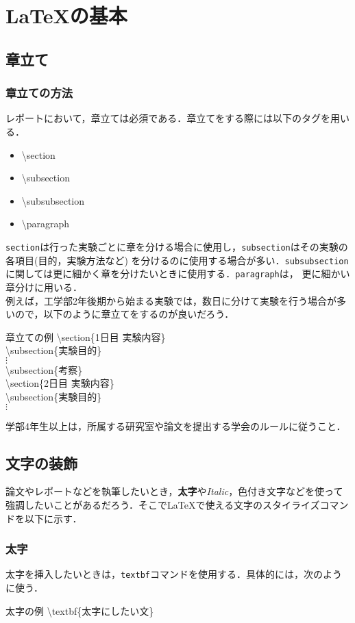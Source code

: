 \section{\LaTeX の基本}
\subsection{章立て}
\subsubsection{章立ての方法}
レポートにおいて，章立ては必須である．章立てをする際には以下のタグを用いる．
\begin{itemize}
  \item \ttfamily \textbackslash section
  \item \textbackslash subsection
  \item \textbackslash subsubsection
  \item \textbackslash paragraph
\end{itemize}
\texttt{section}は行った実験ごとに章を分ける場合に使用し，\texttt{subsection}はその実験の各項目(目的，実験方法など)
を分けるのに使用する場合が多い．\texttt{subsubsection}に関しては更に細かく章を分けたいときに使用する．\texttt{paragraph}は，
更に細かい章分けに用いる．\\
例えば，工学部2年後期から始まる実験では，数日に分けて実験を行う場合が多いので，以下のように章立てをするのが良いだろう．
\begin{itembox}[c]{章立ての例}
  \ttfamily
  \textbackslash section\{1日目 実験内容\}\\
  \textbackslash subsection\{実験目的\}\\
  $\vdots$\\
  \textbackslash subsection\{考察\}\\
  \textbackslash section\{2日目 実験内容\}\\
  \textbackslash subsection\{実験目的\}\\
  $\vdots$
\end{itembox}
学部4年生以上は，所属する研究室や論文を提出する学会のルールに従うこと．
\subsection{文字の装飾}
論文やレポートなどを執筆したいとき，\textbf{太字}や\textit{Italic}，\color{red}色付き文字\color{black}などを使って強調したいことがあるだろう．そこで\LaTeX で使える文字のスタイライズコマンドを以下に示す．
\subsubsection{太字}
太字を挿入したいときは，\texttt{textbf}コマンドを使用する．具体的には，次のように使う．
\begin{itembox}[c]{太字の例}
  \ttfamily
  \textbackslash textbf\{太字にしたい文\}
\end{itembox}
